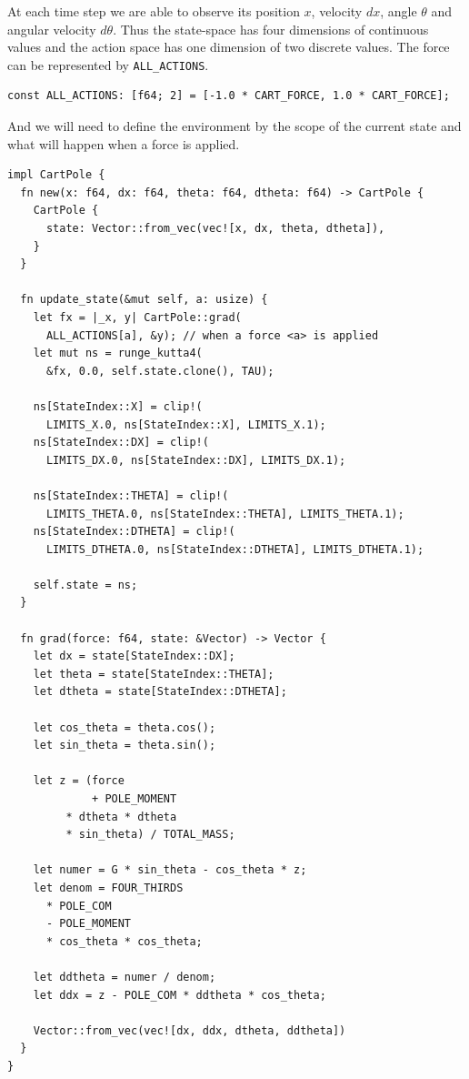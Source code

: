 \documentclass{book}
\begin{document}
At each time step we are able to observe its position $x$, velocity $dx$, angle $\theta$ and angular velocity $d\theta$. Thus the state-space has four dimensions of continuous values and the action space has one dimension of two discrete values. The force can be represented by \lstinline{ALL_ACTIONS}.


\begin{lstlisting}[caption={chapter3\\/rsrl\_custom\\/src\\/main\\.rs},basicstyle=\small]
const ALL_ACTIONS: [f64; 2] = [-1.0 * CART_FORCE, 1.0 * CART_FORCE];
\end{lstlisting}

And we will need to define the environment by the scope of the current state and what will happen when a force is applied.

\begin{lstlisting}[caption={chapter3\\/rsrl\_custom\\/src\\/main\\.toml},basicstyle=\small]
impl CartPole {
  fn new(x: f64, dx: f64, theta: f64, dtheta: f64) -> CartPole {
    CartPole {
      state: Vector::from_vec(vec![x, dx, theta, dtheta]),
    }
  }

  fn update_state(&mut self, a: usize) {
    let fx = |_x, y| CartPole::grad(
      ALL_ACTIONS[a], &y); // when a force <a> is applied
    let mut ns = runge_kutta4(
      &fx, 0.0, self.state.clone(), TAU);

    ns[StateIndex::X] = clip!(
      LIMITS_X.0, ns[StateIndex::X], LIMITS_X.1);
    ns[StateIndex::DX] = clip!(
      LIMITS_DX.0, ns[StateIndex::DX], LIMITS_DX.1);

    ns[StateIndex::THETA] = clip!(
      LIMITS_THETA.0, ns[StateIndex::THETA], LIMITS_THETA.1);
    ns[StateIndex::DTHETA] = clip!(
      LIMITS_DTHETA.0, ns[StateIndex::DTHETA], LIMITS_DTHETA.1);

    self.state = ns;
  }

  fn grad(force: f64, state: &Vector) -> Vector {
    let dx = state[StateIndex::DX];
    let theta = state[StateIndex::THETA];
    let dtheta = state[StateIndex::DTHETA];

    let cos_theta = theta.cos();
    let sin_theta = theta.sin();

    let z = (force
             + POLE_MOMENT
	     * dtheta * dtheta
	     * sin_theta) / TOTAL_MASS;

    let numer = G * sin_theta - cos_theta * z;
    let denom = FOUR_THIRDS
      * POLE_COM
      - POLE_MOMENT
      * cos_theta * cos_theta;

    let ddtheta = numer / denom;
    let ddx = z - POLE_COM * ddtheta * cos_theta;

    Vector::from_vec(vec![dx, ddx, dtheta, ddtheta])
  }
}
\end{lstlisting}
\end{document}
